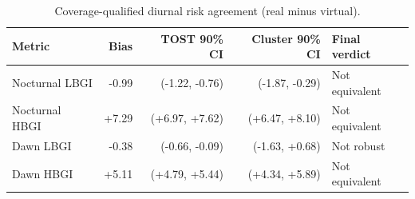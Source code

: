 \begin{table}[!t]
\centering
\caption{Coverage-qualified diurnal risk agreement (real minus virtual).}
\label{tab:diurnal}
\begin{tabular}{lrrrl}
\toprule
Metric & Bias & TOST 90\% CI & Cluster 90\% CI & Final verdict \\
\midrule
Nocturnal LBGI & -0.99 & (-1.22, -0.76) & (-1.87, -0.29) & Not equivalent \\
Nocturnal HBGI & +7.29 & (+6.97, +7.62) & (+6.47, +8.10) & Not equivalent \\
Dawn LBGI & -0.38 & (-0.66, -0.09) & (-1.63, +0.68) & Not robust \\
Dawn HBGI & +5.11 & (+4.79, +5.44) & (+4.34, +5.89) & Not equivalent \\
\bottomrule
\end{tabular}
\end{table}
